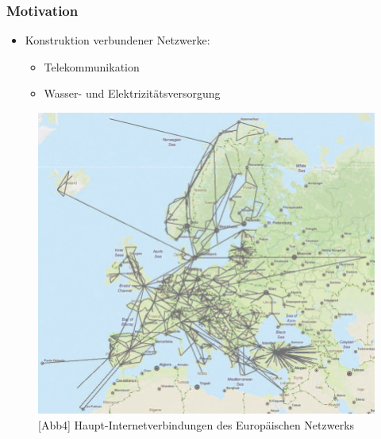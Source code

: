 \begin{frame}
    \frametitle{Motivation}
     {
    \begin{itemize}
    		\item<1-> Konstruktion verbundener Netzwerke: 	\begin{itemize}
    															\item<2-> 	Telekommunikation
    															\item<4-> 	Wasser- und Elektrizitätsversorgung
    														\end{itemize}
    		
    \end{itemize} }
    
   	
	
	
	 	{
					\begin{figure}
						\includegraphics[scale=0.2]{pictures/Example-Internet-backbone-network-topology-in-Europe-6}
						\caption{[Abb4] Haupt-Internetverbindungen des Europäischen Netzwerks}
					\end{figure}
				}
				

\end{frame}
